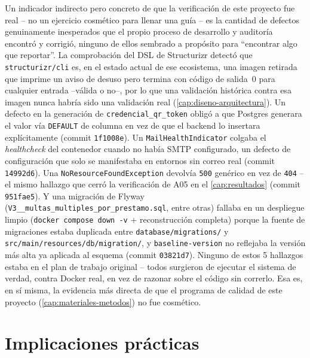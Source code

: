 Un indicador indirecto pero concreto de que la verificación de este
proyecto fue real -- no un ejercicio cosmético para llenar una guía -- es
la cantidad de defectos genuinamente inesperados que el propio proceso de
desarrollo y auditoría encontró y corrigió, ninguno de ellos sembrado a
propósito para ``encontrar algo que reportar''. La comprobación del DSL
de Structurizr detectó que \texttt{structurizr/cli} es, en el estado
actual de ese ecosistema, una imagen retirada que imprime un aviso de
desuso pero termina con código de salida~$0$ para cualquier entrada
--válida o no--, por lo que una validación histórica contra esa imagen
nunca habría sido una validación real
(\autoref{cap:diseno-arquitectura}). Un defecto en la generación de
\texttt{credencial\_qr\_token} obligó a que Postgres generara el valor
vía \texttt{DEFAULT} de columna en vez de que el backend lo insertara
explícitamente (commit \texttt{1f1008e}). Un \texttt{MailHealthIndicator}
colgaba el \emph{healthcheck} del contenedor cuando no había SMTP
configurado, un defecto de configuración que solo se manifestaba en
entornos sin correo real (commit \texttt{14992d6}). Una
\texttt{NoResourceFoundException} devolvía \texttt{500} genérico en vez
de \texttt{404} -- el mismo hallazgo que cerró la verificación de A05 en
el \autoref{cap:resultados} (commit \texttt{951fae5}). Y una migración de
Flyway (\texttt{V3\_\_multas\_multiples\_por\_prestamo.sql}, entre otras)
fallaba en un despliegue limpio (\texttt{docker compose down -v} +
reconstrucción completa) porque la fuente de migraciones estaba duplicada
entre \texttt{database/migrations/} y \texttt{src/main/resources/db/migration/},
y \texttt{baseline-version} no reflejaba la versión más alta ya aplicada
al esquema (commit \texttt{03821d7}). Ninguno de estos 5 hallazgos estaba
en el plan de trabajo original -- todos surgieron de ejecutar el sistema
de verdad, contra Docker real, en vez de razonar sobre el código sin
correrlo. Esa es, en sí misma, la evidencia más directa de que el
programa de calidad de este proyecto (\autoref{cap:materiales-metodos})
no fue cosmético.

\section{Implicaciones prácticas}

